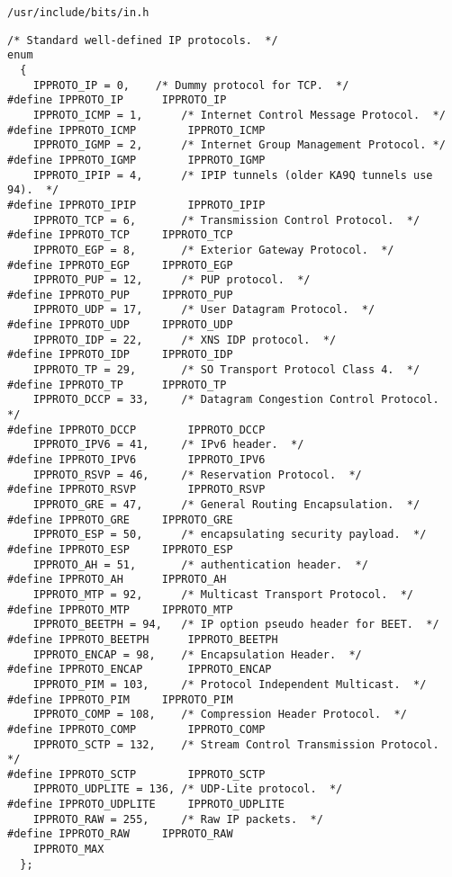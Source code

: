 \documentclass{article}
\begin{document}
\lstinline+/usr/include/bits/in.h+
\begin{lstlisting}
/* Standard well-defined IP protocols.  */
enum
  {
    IPPROTO_IP = 0,	   /* Dummy protocol for TCP.  */
#define IPPROTO_IP		IPPROTO_IP
    IPPROTO_ICMP = 1,	   /* Internet Control Message Protocol.  */
#define IPPROTO_ICMP		IPPROTO_ICMP
    IPPROTO_IGMP = 2,	   /* Internet Group Management Protocol. */
#define IPPROTO_IGMP		IPPROTO_IGMP
    IPPROTO_IPIP = 4,	   /* IPIP tunnels (older KA9Q tunnels use 94).  */
#define IPPROTO_IPIP		IPPROTO_IPIP
    IPPROTO_TCP = 6,	   /* Transmission Control Protocol.  */
#define IPPROTO_TCP		IPPROTO_TCP
    IPPROTO_EGP = 8,	   /* Exterior Gateway Protocol.  */
#define IPPROTO_EGP		IPPROTO_EGP
    IPPROTO_PUP = 12,	   /* PUP protocol.  */
#define IPPROTO_PUP		IPPROTO_PUP
    IPPROTO_UDP = 17,	   /* User Datagram Protocol.  */
#define IPPROTO_UDP		IPPROTO_UDP
    IPPROTO_IDP = 22,	   /* XNS IDP protocol.  */
#define IPPROTO_IDP		IPPROTO_IDP
    IPPROTO_TP = 29,	   /* SO Transport Protocol Class 4.  */
#define IPPROTO_TP		IPPROTO_TP
    IPPROTO_DCCP = 33,	   /* Datagram Congestion Control Protocol.  */
#define IPPROTO_DCCP		IPPROTO_DCCP
    IPPROTO_IPV6 = 41,     /* IPv6 header.  */
#define IPPROTO_IPV6		IPPROTO_IPV6
    IPPROTO_RSVP = 46,	   /* Reservation Protocol.  */
#define IPPROTO_RSVP		IPPROTO_RSVP
    IPPROTO_GRE = 47,	   /* General Routing Encapsulation.  */
#define IPPROTO_GRE		IPPROTO_GRE
    IPPROTO_ESP = 50,      /* encapsulating security payload.  */
#define IPPROTO_ESP		IPPROTO_ESP
    IPPROTO_AH = 51,       /* authentication header.  */
#define IPPROTO_AH		IPPROTO_AH
    IPPROTO_MTP = 92,	   /* Multicast Transport Protocol.  */
#define IPPROTO_MTP		IPPROTO_MTP
    IPPROTO_BEETPH = 94,   /* IP option pseudo header for BEET.  */
#define IPPROTO_BEETPH		IPPROTO_BEETPH
    IPPROTO_ENCAP = 98,	   /* Encapsulation Header.  */
#define IPPROTO_ENCAP		IPPROTO_ENCAP
    IPPROTO_PIM = 103,	   /* Protocol Independent Multicast.  */
#define IPPROTO_PIM		IPPROTO_PIM
    IPPROTO_COMP = 108,	   /* Compression Header Protocol.  */
#define IPPROTO_COMP		IPPROTO_COMP
    IPPROTO_SCTP = 132,	   /* Stream Control Transmission Protocol.  */
#define IPPROTO_SCTP		IPPROTO_SCTP
    IPPROTO_UDPLITE = 136, /* UDP-Lite protocol.  */
#define IPPROTO_UDPLITE		IPPROTO_UDPLITE
    IPPROTO_RAW = 255,	   /* Raw IP packets.  */
#define IPPROTO_RAW		IPPROTO_RAW
    IPPROTO_MAX
  };
\end{lstlisting}


\end{document}
